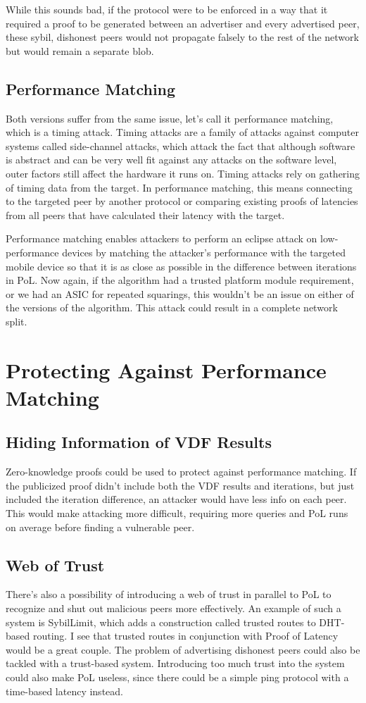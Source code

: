 While this sounds bad, if the protocol were to be enforced in a way that it required a proof to be generated between an advertiser and every advertised peer, these sybil, dishonest peers would not propagate falsely to the rest of the network but would remain a separate blob.

\subsection{Performance Matching}
Both versions suffer from the same issue, let's call it performance matching, which is a timing attack. Timing attacks are a family of attacks against computer systems called side-channel attacks, which attack the fact that although software is abstract and can be very well fit against any attacks on the software level, outer factors still affect the hardware it runs on. Timing attacks rely on gathering of timing data from the target.\cite{noauthor_undated-mp} In performance matching, this means connecting to the targeted peer by another protocol or comparing existing proofs of latencies from all peers that have calculated their latency with the target.

Performance matching enables attackers to perform an eclipse attack on low-performance devices by matching the attacker's performance with the targeted mobile device so that it is as close as possible in the difference between iterations in PoL. Now again, if the algorithm had a trusted platform module requirement, or we had an ASIC for repeated squarings, this wouldn't be an issue on either of the versions of the algorithm. This attack could result in a complete network split.

\section{Protecting Against Performance Matching}
\subsection{Hiding Information of VDF Results}
Zero-knowledge proofs could be used to protect against performance matching. If the publicized proof didn't include both the VDF results and iterations, but just included the iteration difference, an attacker would have less info on each peer. This would make attacking more difficult, requiring more queries and PoL runs on average before finding a vulnerable peer.

\subsection{Web of Trust}
There's also a possibility of introducing a web of trust in parallel to PoL to recognize and shut out malicious peers more effectively. An example of such a system is SybilLimit, which adds a construction called trusted routes to DHT-based routing.\cite{Yu2008-xl} I see that trusted routes in conjunction with Proof of Latency would be a great couple. The problem of advertising dishonest peers could also be tackled with a trust-based system. Introducing too much trust into the system could also make PoL useless, since there could be a simple ping protocol with a time-based latency instead.

